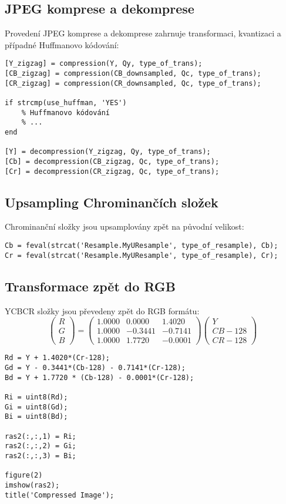 \subsection{JPEG komprese a dekomprese}
Provedení JPEG komprese a dekomprese zahrnuje transformaci, kvantizaci a případné Huffmanovo kódování:
\begin{verbatim}
[Y_zigzag] = compression(Y, Qy, type_of_trans);
[CB_zigzag] = compression(CB_downsampled, Qc, type_of_trans);
[CR_zigzag] = compression(CR_downsampled, Qc, type_of_trans);

if strcmp(use_huffman, 'YES')
    % Huffmanovo kódování
    % ...
end

[Y] = decompression(Y_zigzag, Qy, type_of_trans);
[Cb] = decompression(CB_zigzag, Qc, type_of_trans);
[Cr] = decompression(CR_zigzag, Qc, type_of_trans);
\end{verbatim}

\subsection{Upsampling Chrominančích složek}
Chrominanční složky jsou upsamplovány zpět na původní velikost:
\begin{verbatim}
Cb = feval(strcat('Resample.MyUResample', type_of_resample), Cb);
Cr = feval(strcat('Resample.MyUResample', type_of_resample), Cr);
\end{verbatim}

\subsection{Transformace zpět do RGB}
YCBCR složky jsou převedeny zpět do RGB formátu\cite{pIDhmNtdwMgbcGoe}\cite{ygeiGeoinf2}:
\[
\begin{pmatrix}
R \\
G \\
B
\end{pmatrix}
=
\begin{pmatrix}
1.0000 & 0.0000 & 1.4020 \\
1.0000 & -0.3441 & -0.7141 \\
1.0000 & 1.7720 & -0.0001
\end{pmatrix}
\begin{pmatrix}
Y \\
CB - 128 \\
CR - 128
\end{pmatrix}
\]

\begin{verbatim}
Rd = Y + 1.4020*(Cr-128);
Gd = Y - 0.3441*(Cb-128) - 0.7141*(Cr-128);
Bd = Y + 1.7720 * (Cb-128) - 0.0001*(Cr-128);

Ri = uint8(Rd);
Gi = uint8(Gd);
Bi = uint8(Bd);

ras2(:,:,1) = Ri;
ras2(:,:,2) = Gi;
ras2(:,:,3) = Bi;

figure(2)
imshow(ras2);
title('Compressed Image');
\end{verbatim}

